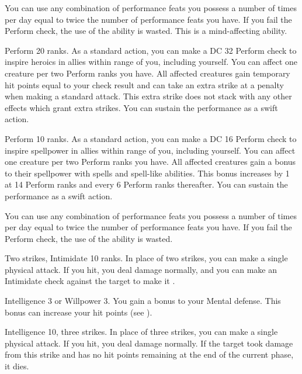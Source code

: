 You can use any combination of performance feats you possess a number of times per day equal to twice the number of performance feats you have.
If you fail the Perform check, the use of the ability is wasted.
This is a mind-affecting ability.

\featpre Perform 20 ranks.
\featben As a standard action, you can make a DC 32 Perform check to inspire heroics in allies within \rngmed range of you, including yourself.
You can affect one creature per two Perform ranks you have.
All affected creatures gain temporary hit points equal to your check result and can take an extra strike at a  penalty when making a standard attack.
This extra strike does not stack with any other effects which grant extra strikes.
You can sustain the performance as a swift action.

\featpre Perform 10 ranks.
\featben As a standard action, you can make a DC 16 Perform check to inspire spellpower in allies within \rngmed range of you, including yourself.
You can affect one creature per two Perform ranks you have.
All affected creatures gain a  bonus to their spellpower with spells and spell-like abilities.
This bonus increases by 1 at 14 Perform ranks and every 6 Perform ranks thereafter.
You can sustain the performance as a swift action.

You can use any combination of performance feats you possess a number of times per day equal to twice the number of performance feats you have.
If you fail the Perform check, the use of the ability is wasted.

\featpres Two strikes, Intimidate 10 ranks.
\featben In place of two strikes, you can make a single physical attack.
If you hit, you deal damage normally, and you can make an Intimidate check against the target to make it \shaken.

\featpre Intelligence 3 or Willpower 3.
\featben You gain a  bonus to your Mental defense.
This bonus can increase your hit points (see ).

\featpre Intelligence 10, three strikes.
\featben In place of three strikes, you can make a single physical attack.
If you hit, you deal damage normally.
If the target took damage from this strike and has no hit points remaining at the end of the current phase, it dies.


